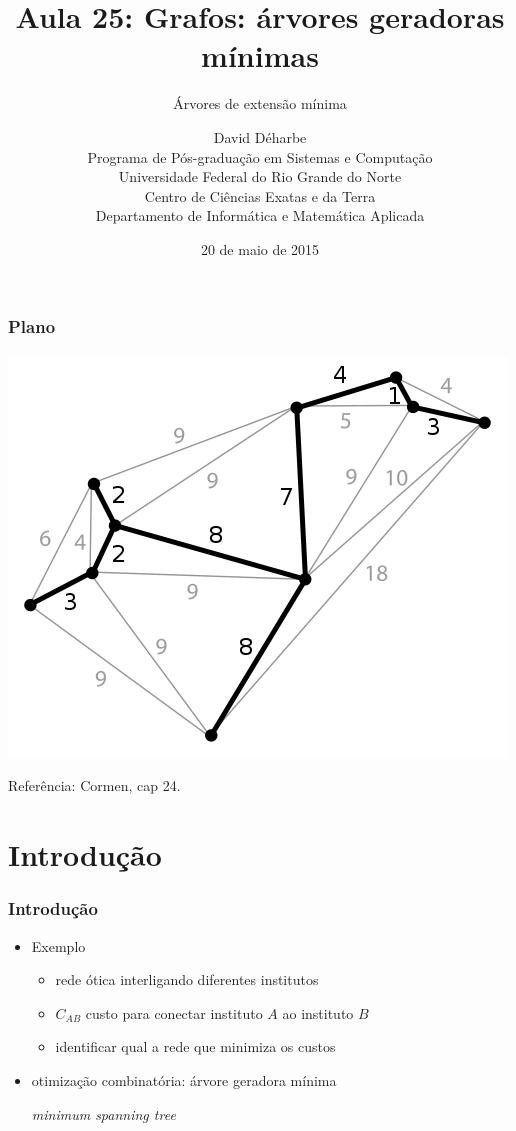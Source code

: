 \documentclass{beamer}
\title{Aula 25: Grafos: árvores geradoras mínimas}
\subtitle{Árvores de extensão mínima}
\author{David Déharbe \\
  Programa de Pós-graduação em Sistemas e Computação \\
  Universidade Federal do Rio Grande do Norte \\
  Centro de Ciências Exatas e da Terra \\
  Departamento de Informática e Matemática Aplicada}
\date{20 de maio de 2015}
\begin{document}

\begin{frame}
  \titlepage
\end{frame}

\begin{frame}
  \frametitle{Plano}
\begin{center}
\includegraphics[height=.5\textheight]{fig/minimum_spanning_tree.png}
\end{center}
  \tableofcontents
Referência: Cormen, cap 24.
\end{frame}

\section{Introdução}

\begin{frame}
\frametitle{Introdução}

\begin{itemize}
\item Exemplo
\begin{itemize}
\item rede ótica interligando diferentes institutos
\item $C_{AB}$ custo para conectar instituto $A$ ao instituto $B$
\item identificar qual a rede que minimiza os custos
\end{itemize}
\item \alert{otimização combinatória}: árvore geradora mínima 

\textit{minimum spanning tree}
\end{itemize}

\end{frame}
\end{document}
